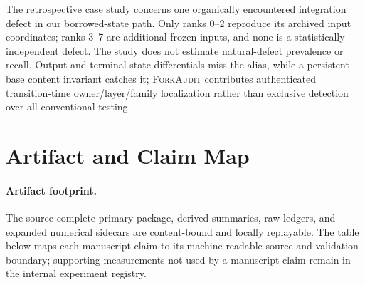 \documentclass{article}
\newcommand{\method}{\textsc{ForkAudit}}
\begin{document}
The retrospective case study concerns one organically encountered integration
defect in our borrowed-state path.  Only ranks 0--2 reproduce its archived
input coordinates; ranks 3--7 are additional frozen inputs, and none is a
statistically independent defect.  The study does not estimate natural-defect
prevalence or recall.  Output and terminal-state differentials miss the alias,
while a persistent-base content invariant catches it; \method{} contributes
authenticated transition-time owner/layer/family localization rather than
exclusive detection over all conventional testing.

\section{Artifact and Claim Map}
\label{app:artifact}

\paragraph{Artifact footprint.}
The source-complete primary package, derived summaries, raw ledgers, and expanded
numerical sidecars are content-bound and locally replayable.  The table below
maps each manuscript claim to its machine-readable source and validation
boundary; supporting measurements not used by a manuscript claim remain in
the internal experiment registry.
\end{document}
